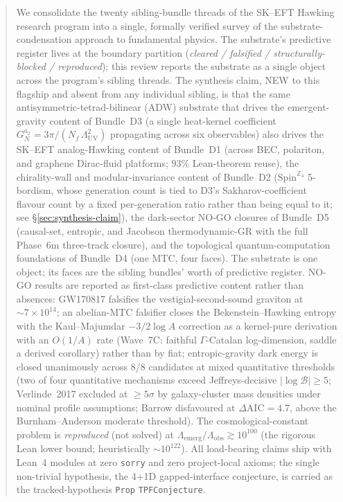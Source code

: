 \documentclass[aps,prd,reprint,nofootinbib,superscriptaddress]{revtex4-2}
\begin{document}
\begin{abstract}
We consolidate the twenty sibling-bundle threads of the SK--EFT
Hawking research program into a single, formally verified survey of the
substrate-condensation approach to fundamental physics. The
substrate's predictive register lives at the boundary partition
(\emph{cleared / falsified / structurally-blocked / reproduced}); this
review reports the substrate as a single object across the program's
sibling threads. The synthesis claim, NEW to this flagship and absent
from any individual sibling, is that the same antisymmetric-tetrad-bilinear
(ADW) substrate that drives the emergent-gravity content of
Bundle~D3 (a single heat-kernel coefficient
$G_N^{a_2} = 3\pi/(N_f\,\Lambda_{\mathrm{UV}}^{2})$
propagating across six observables) also drives the SK--EFT analog-Hawking
content of Bundle~D1 (across BEC, polariton, and graphene Dirac-fluid
platforms; $93\%$ Lean-theorem reuse), the chirality-wall and
modular-invariance content of Bundle~D2
($\mathrm{Spin}^{\mathbb{Z}_4}$ 5-bordism, whose generation count is
tied to D3's Sakharov-coefficient flavour count by a fixed
per-generation ratio rather than being equal to it; see
\S\ref{sec:synthesis-claim}), the dark-sector NO-GO closures of
Bundle~D5 (causal-set, entropic, and Jacobson thermodynamic-GR with
the full Phase~6m three-track closure), and the topological
quantum-computation foundations of Bundle~D4 (one MTC, four faces).
The substrate is one object; its faces are the sibling bundles'
worth of predictive register. NO-GO results are reported as
first-class predictive content rather than absences: GW170817 falsifies
the vestigial-second-sound graviton at $\sim 7\times 10^{14}$; an
abelian-MTC falsifier closes the Bekenstein--Hawking entropy with the
Kaul--Majumdar $-3/2 \log A$ correction as a kernel-pure derivation with an
$O(1/A)$ rate (Wave~7C: faithful $\Gamma$-Catalan log-dimension, saddle a derived
corollary) rather than by fiat; entropic-gravity dark energy is closed unanimously across $8/8$
candidates at mixed quantitative thresholds (two of four
quantitative mechanisms exceed Jeffreys-decisive
$|\log\mathcal{B}| \geq 5$; Verlinde~2017 excluded at $\geq 5\sigma$
by galaxy-cluster mass densities under nominal profile assumptions;
Barrow disfavoured at
$\Delta\!\mathrm{AIC} = 4.7$, above the Burnham--Anderson moderate
threshold).
The cosmological-constant problem is \emph{reproduced} (not solved) at
$\Lambda_{\mathrm{emerg}}/\Lambda_{\mathrm{obs}} \gtrsim 10^{100}$
(the rigorous Lean lower bound; heuristically $\sim 10^{122}$). All
load-bearing claims ship with Lean~4 modules at zero \texttt{sorry}
and zero project-local axioms; the single non-trivial hypothesis,
the 4+1D gapped-interface conjecture, is carried as the
tracked-hypothesis \texttt{Prop} \texttt{TPFConjecture}.
\end{abstract}
\end{document}
